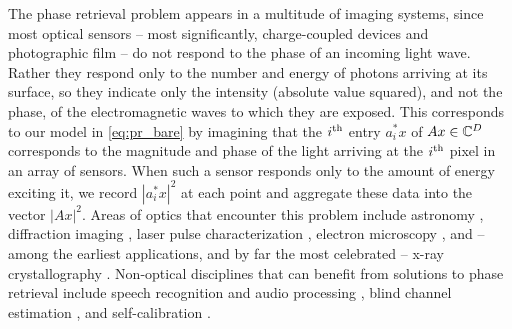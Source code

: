   The phase retrieval problem appears in a multitude of imaging systems, since most optical sensors -- most significantly, charge-coupled devices and photographic film -- do not respond to the phase of an incoming light wave.  Rather they respond only to the number and energy of photons arriving at its surface, so they indicate only the intensity (absolute value squared), and not the phase, of the electromagnetic waves to which they are exposed.  This corresponds to our model in \eqref{eq:pr_bare} by imagining that the $i^{\text{th}}$ entry $a_i^* x$ of $Ax \in \mathbb{C}^D$ corresponds to the magnitude and phase of the light arriving at the $i^{\text{th}}$ pixel in an array of sensors.  When such a sensor responds only to the amount of energy exciting it, we record $|a_i^* x|^2$ at each point and aggregate these data into the vector $|A x|^2$.  Areas of optics that encounter this problem include astronomy \cite{fienup1987astronomy,walther1963question}, diffraction imaging \cite{millane1990phase,rodenburg2008diffractive,shechtman2015phase}, laser pulse characterization \cite{bendory2017frog,bendory2018frog,sidorenko2017frog}, electron microscopy \cite{putkunz2012electron}, and -- among the earliest applications, and by far the most celebrated -- x-ray crystallography \cite{bragg1915crystal_structure,marchesini2015coptych,dierolf2008ptych,harrison1993phase,hauptman1953monograph,starodub2008damage}.  Non-optical disciplines that can benefit from solutions to phase retrieval include speech recognition and audio processing \cite{balan2006signal,juang1993speechrec,waldspurger2017wavelet,waldspurger2015cauchy}, blind channel estimation \cite{strohmer2017wtf_deconv1, strohmer2017wtf_deconv2}, and self-calibration \cite{strohmer2015self_calib}.

